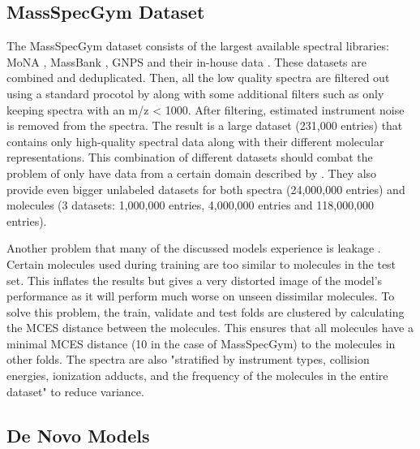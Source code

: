 \subsection{MassSpecGym Dataset}
\label{subsec:massspecgymdataset}
The MassSpecGym dataset consists of the largest available spectral libraries: MoNA \cite{mona}, MassBank \cite{horai2010massbank}, GNPS \cite{wang2016sharing} and their in-house data \cite{brungs2024efficient}.
These datasets are combined and deduplicated.
Then, all the low quality spectra are filtered out using a standard procotol by \textcite{de2023reproducible} along with some additional filters such as only keeping spectra with an m/z < 1000. After filtering, estimated instrument noise is removed from the spectra. The result is a large dataset (231,000 entries) that contains only high-quality spectral data along with their different molecular representations. This combination of different datasets should combat the problem of only have data from a certain domain described by \textcite{kretschmer2023small}. They also provide even bigger unlabeled datasets for both spectra (24,000,000 entries) and molecules (3 datasets: 1,000,000 entries, 4,000,000 entries and 118,000,000 entries).

Another problem that many of the discussed models experience is leakage \cite{bushuiev2024massspecgym}. Certain molecules used during training are too similar to molecules in the test set. This inflates the results but gives a very distorted image of the model's performance as it will perform much worse on unseen dissimilar molecules. To solve this problem, the train, validate and test folds are clustered by calculating the \ac{MCES} distance between the molecules. This ensures that all molecules have a minimal \ac{MCES} distance (10 in the case of MassSpecGym) to the molecules in other folds. The spectra are also "stratified by instrument types, collision energies, ionization adducts, and the frequency of the molecules in the entire dataset" \cite{bushuiev2024massspecgym} to reduce variance.

\subsection{De Novo Models}
\label{subsec:massspecgymmodels}

